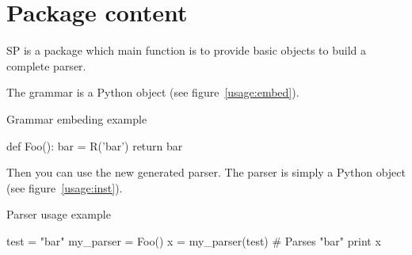 %
%
%

\section{Package content}

SP is a package which main function is to provide basic objects to build a complete parser.

The grammar is a Python object (see figure~\ref{usage:embed}).

\begin{code}
\caption{Grammar embeding example}                          \label{usage:embed}
\begin{verbatimtab}[4]
    def Foo():
        bar = R('bar')
        return bar
\end{verbatimtab}
\end{code}

Then you can use the new generated parser. The parser is simply a Python object (see figure~\ref{usage:inst}).

\begin{code}
\caption{Parser usage example}                              \label{usage:inst}
\begin{verbatimtab}[4]
    test = "bar"
    my_parser = Foo()
    x = my_parser(test)               # Parses "bar"
    print x
\end{verbatimtab}
\end{code}
